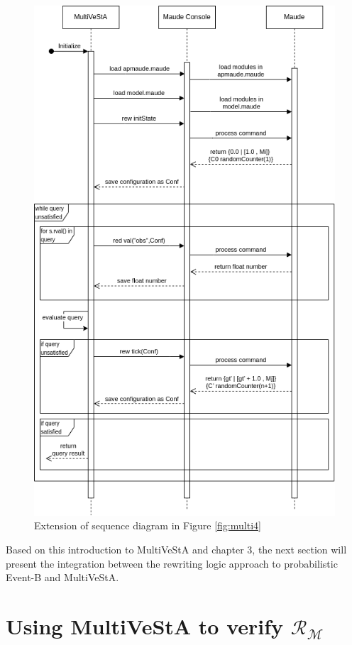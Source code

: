 \begin{figure}[H]
    \centering
    \includegraphics[scale = 0.5]{images/multi5.png}
    \caption{Extension of sequence diagram in Figure \ref{fig:multi4}}
    \label{fig:multi5}
\end{figure}

Based on this introduction to MultiVeStA and chapter 3, the next section will present the integration between the rewriting logic approach to probabilistic Event-B and MultiVeStA.

\section{Using MultiVeStA to verify $\mathscr{R}_\mathscr{M}$}

